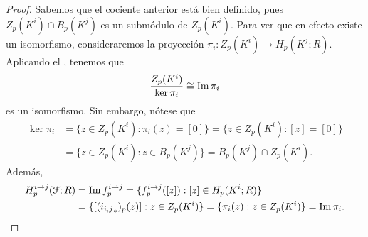 \begin{proof}
	Sabemos que el cociente anterior está bien definido, pues
	$Z_{p}(K^{i}) \cap B_{p}(K^{j})$ es un submódulo de $Z_{p}(K^{i})$. Para ver que
	en efecto existe un isomorfismo, consideraremos la proyección
	$\pi_{i} : Z_{p}(K^{i}) \to H_{p}(K^{j};R)$. Aplicando el ,
	tenemos que
	\[
	\frac{Z_{p}(K^{i})}{\ker \pi_{i}}\cong \operatorname{Im} \pi_{i}
	\]
	es un isomorfismo. Sin embargo, nótese que
	\begin{align*}
		\ker \pi_{i} & = \{z \in Z_{p}(K^{i}) : \pi_{i}(z) = [0] \} = \{z \in Z_{p}(K^{i}) : [z] = [0] \} \\
		& = \{z \in Z_{p}(K^{i}) : z \in B_{p}(K^{j}) \} = B_{p}(K^{j}) \cap Z_{p}(K^{i}).
	\end{align*}
	Además,
	\begin{align*}
		H_{p}^{i \to j}(\mathcal{F};R) & = \operatorname{Im} f_{p}^{i \to j}= \{f_{p}^{i \to j}([z]) : [z] \in H_{p}(K^{i};R) \}                                  \\
		& = \{[({i_{i,j}}_{*})_{p}(z)] : z \in Z_{p}(K^{i}) \} = \{\pi_{i}(z) : z \in Z_{p}(K^{i}) \} = \operatorname{Im} \pi_{i}.
	\end{align*}
\end{proof}
%
%
%
